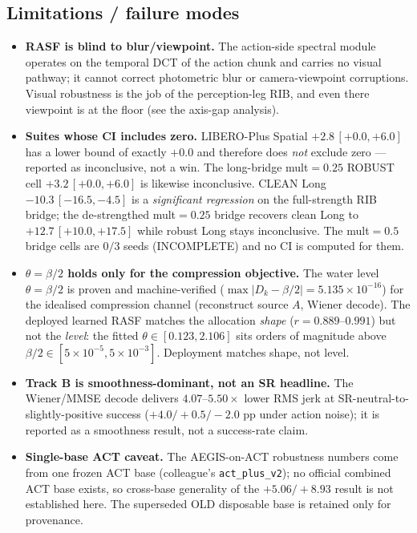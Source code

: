 \subsection{Limitations / failure modes}

\begin{itemize}
\item \textbf{RASF is blind to blur/viewpoint.} The action-side spectral module
operates on the temporal DCT of the action chunk and carries no visual pathway;
it cannot correct photometric blur or camera-viewpoint corruptions. Visual
robustness is the job of the perception-leg RIB, and even there viewpoint is at
the floor (see the axis-gap analysis).

\item \textbf{Suites whose CI includes zero.} LIBERO-Plus Spatial
$+2.8\,[+0.0,+6.0]$ has a lower bound of exactly $+0.0$ and therefore does
\emph{not} exclude zero --- reported as inconclusive, not a win. The long-bridge
mult$=0.25$ ROBUST cell $+3.2\,[+0.0,+6.0]$ is likewise inconclusive. CLEAN Long
$-10.3\,[-16.5,-4.5]$ is a \emph{significant regression} on the full-strength RIB
bridge; the de-strengthed mult$=0.25$ bridge recovers clean Long to
$+12.7\,[+10.0,+17.5]$ while robust Long stays inconclusive. The mult$=0.5$
bridge cells are $0/3$ seeds (INCOMPLETE) and no CI is computed for them.

\item \textbf{$\theta=\beta/2$ holds only for the compression objective.} The
water level $\theta=\beta/2$ is proven and machine-verified
($\max|D_k-\beta/2|=5.135\times10^{-16}$) for the idealised compression channel
(reconstruct source $A$, Wiener decode). The deployed learned RASF matches the
allocation \emph{shape} ($r=0.889$--$0.991$) but not the \emph{level}: the fitted
$\theta\in[0.123,2.106]$ sits orders of magnitude above
$\beta/2\in[5\times10^{-5},5\times10^{-3}]$. Deployment matches shape, not level.

\item \textbf{Track B is smoothness-dominant, not an SR headline.} The
Wiener/MMSE decode delivers $4.07$--$5.50\times$ lower RMS jerk at
SR-neutral-to-slightly-positive success ($+4.0/+0.5/-2.0$ pp under action noise);
it is reported as a smoothness result, not a success-rate claim.

\item \textbf{Single-base ACT caveat.} The AEGIS-on-ACT robustness numbers come
from one frozen ACT base (colleague's \texttt{act\_plus\_v2}); no official
combined ACT base exists, so cross-base generality of the $+5.06/+8.93$ result is
not established here. The superseded OLD disposable base is retained only for
provenance.


\end{itemize}
